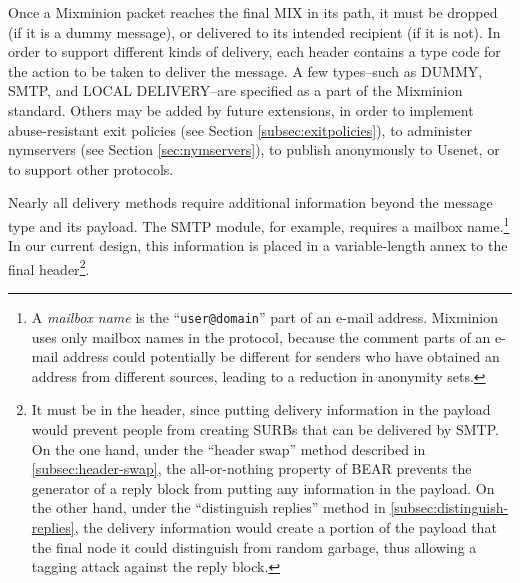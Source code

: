 \documentclass{llncs}
\begin{document}
Once a Mixminion packet reaches the final MIX in its path, it must be
dropped (if it is a dummy message), or delivered to its intended
recipient (if it is not).  In order to support different kinds of
delivery, each header contains a type code for the action to be taken
to deliver the message.  A few types--such as DUMMY, SMTP, and LOCAL
DELIVERY--are specified as a part of the Mixminion standard.  Others
may be added by future extensions, in order to implement
abuse-resistant exit policies (see Section \ref{subsec:exitpolicies}),
to administer nymservers (see Section \ref{sec:nymservers}), to publish
anonymously to Usenet, or to support other protocols.


Nearly all delivery methods require additional information beyond the
message type and its payload.  The SMTP module, for example, requires
a mailbox name.\footnote{A {\it mailbox name} is the ``{\tt user@domain}''
part of an e-mail address. Mixminion uses only mailbox names in the
protocol, because the comment parts of an e-mail address could potentially
be different for senders who have obtained an address from different
sources, leading to a reduction in anonymity sets.}
In our current design, this information is placed
in a variable-length annex to the final header\footnote{It must be
in the header, since putting delivery information in the payload would
prevent people from creating SURBs that can be delivered by SMTP.
On the one hand, under the ``header swap'' method described in
\ref{subsec:header-swap}, the all-or-nothing property of BEAR prevents
the generator of a reply block from putting any information in the
payload.  On the other hand, under the ``distinguish replies'' method
in \ref{subsec:distinguish-replies}, the delivery information would
create a portion of the payload that the final node it could
distinguish from random garbage, thus allowing a tagging attack
against the reply block.}.
%
\end{document}

